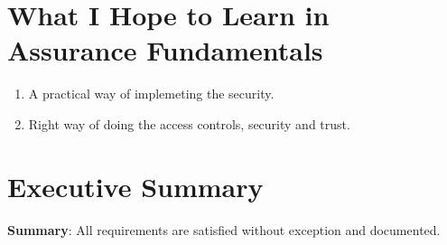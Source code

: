 \documentclass{article}
\begin{document}
\section{What I Hope to Learn in Assurance Fundamentals}
\label{sec:what-i-hope}
\begin{enumerate}
\item A practical way of implemeting the security.
\item Right way of doing the access controls, security and trust.
\end{enumerate}

\section{Executive Summary}
\label{sec:executive-summary}
\textbf{Summary}: All requirements are satisfied without exception and documented.
\end{document}
